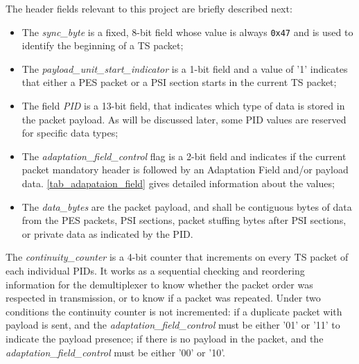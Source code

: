 \documentclass[
	12pt,				%
	openright,			%
	twoside,			%
	a4paper,			%
	brazil,
	french,				%
	english
	]{abntex2}
\begin{document}
The header fields relevant to this project are briefly described next:
\begin{itemize}
\item{The \textit{sync\hspace{0.1mm}\_\hspace{0.1mm}byte} is a fixed, 8-bit field whose value is always \texttt{0x47} and is used to identify the beginning of a TS packet;}
\item{ The \textit{payload\hspace{0.1mm}\_\hspace{0.1mm}unit\hspace{0.1mm}\_\hspace{0.1mm}start\hspace{0.1mm}\_\hspace{0.1mm}indicator} is a 1-bit field and a value of '1' indicates that either a PES packet or a PSI section starts in the current TS packet;}
\item{The field \textit{PID} is a 13-bit field, that indicates which type of data is stored in the packet payload. As will be discussed later, some PID values are reserved for specific data types;}
\item{The \textit{adaptation\hspace{0.1mm}\_\hspace{0.1mm}field\hspace{0.1mm}\_\hspace{0.1mm}control} flag is a 2-bit field and indicates if the current packet mandatory header is followed by an Adaptation Field and/or payload data. \autoref{tab_adapataion_field} gives detailed information about the values;}
\item{The \textit{data\hspace{0.1mm}\_\hspace{0.1mm}bytes} are the packet payload, and shall be contiguous bytes of data from the PES packets, PSI sections, packet stuffing bytes after PSI sections, or private data as indicated by the PID.}
 \end{itemize}

The \textit{continuity\hspace{0.1mm}\_\hspace{0.1mm}counter} is a 4-bit counter that increments on every TS packet of each individual PIDs. It works as a sequential checking and reordering information for the demultiplexer to know whether the packet order was respected in transmission, or to know if a packet was repeated. Under two conditions the continuity counter is not incremented: if a duplicate packet with payload is sent, and the \textit{adaptation\hspace{0.1mm}\_\hspace{0.1mm}field\hspace{0.1mm}\_\hspace{0.1mm}control} must be either '01' or '11' to indicate the payload presence; if there is no payload in the packet, and the \textit{adaptation\hspace{0.1mm}\_\hspace{0.1mm}field\hspace{0.1mm}\_\hspace{0.1mm}control} must be either '00' or '10'.
 
\end{document}
